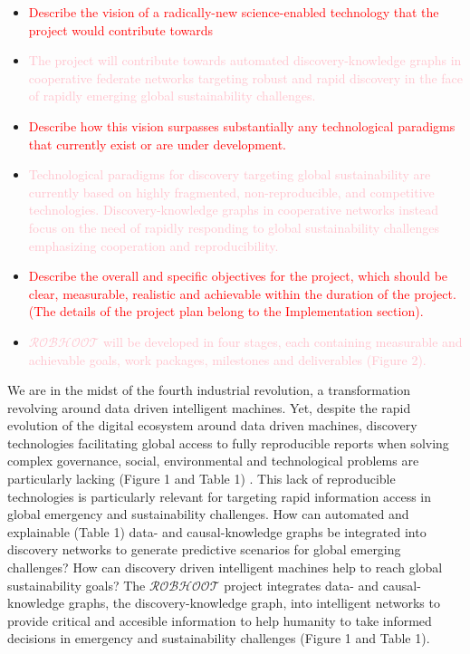 \documentclass[11pt, a4paper]{article} %
\begin{document}
\begin{itemize}
\item \textcolor{red}{Describe the vision of a radically-new
    science-enabled technology that the project would contribute
    towards}
\item \textcolor{pink}{The project will contribute towards automated
    discovery-knowledge graphs in cooperative federate networks
    targeting robust and rapid discovery in the face of rapidly
    emerging global sustainability challenges.}
\item \textcolor{red}{Describe how this vision surpasses substantially
    any technological paradigms that currently exist or are under
    development.}
\item \textcolor{pink}{Technological paradigms for discovery targeting
    global sustainability are currently based on highly fragmented,
    non-reproducible, and competitive
    technologies. Discovery-knowledge graphs in cooperative networks
    instead focus on the need of rapidly responding to global
    sustainability challenges emphasizing cooperation and
    reproducibility.}
\item \textcolor{red}{Describe the overall and specific objectives for
    the project, which should be clear, measurable, realistic and
    achievable within the duration of the project. (The details of the
    project plan belong to the Implementation section).}
\item \textcolor{pink}{$\mathcal{ROBHOOT}$ will be developed in four
    stages, each containing measurable and achievable goals, work
    packages, milestones and deliverables (Figure 2).}
\end{itemize}

We are in the midst of the fourth industrial revolution, a
transformation revolving around data driven intelligent machines. Yet,
despite the rapid evolution of the digital ecosystem around data
driven machines, discovery technologies facilitating global access to
fully reproducible reports when solving complex governance, social,
environmental and technological problems are particularly lacking
(Figure 1 and Table 1) \citep{Mastrangelo2019}. This lack of
reproducible technologies is particularly relevant for targeting rapid
information access in global emergency and sustainability
challenges. How can automated and explainable (Table 1) data- and
causal-knowledge graphs be integrated into discovery networks to
generate predictive scenarios for global emerging challenges? How can
discovery driven intelligent machines help to reach global
sustainability goals? The $\mathcal{ROBHOOT}$ project integrates data-
and causal-knowledge graphs, the discovery-knowledge graph, into
intelligent networks to provide critical and accesible information to
help humanity to take informed decisions in emergency and
sustainability challenges (Figure 1 and Table 1).
\end{document}
